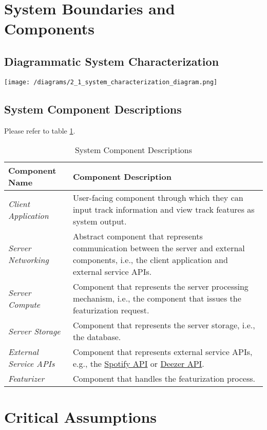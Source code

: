 \documentclass{article}
\begin{document}
\section{System Boundaries and Components}
\subsection{Diagrammatic System Characterization}
\begin{center}
    \texttt{[image: /diagrams/2\_1\_system\_characterization\_diagram.png]}
\end{center}
\subsection{System Component Descriptions}
Please refer to table \ref{tbl:sys-cmpnt-desc}.
\begin{table}[h!]
    \centering
    \begin{tabular}{ p{.25\linewidth} || p{.65\linewidth} }
      \textbf{Component Name} & \textbf{Component Description} \\
      \toprule
      \emph{Client Application} & User-facing component through which they can input track information and view track features as system output. \\
      \midrule
      \emph{Server Networking} & Abstract component that represents communication between the server and external components, i.e., the client application and external service APIs. \\
      \midrule
      \emph{Server Compute} & Component that represents the server processing mechanism, i.e., the component that issues the featurization request. \\
      \midrule
      \emph{Server Storage} & Component that represents the server storage, i.e., the database. \\
      \midrule
      \emph{External Service APIs} & Component that represents external service APIs, e.g., the \href{https://developer.spotify.com/}{Spotify API} or \href{https://developers.deezer.com/}{Deezer API}. \\
      \midrule
      \emph{Featurizer} & Component that handles the featurization process.
    \end{tabular}
    \label{tbl:sys-cmpnt-desc}
    \caption{System Component Descriptions}
  \end{table}

\newpage
\section{Critical Assumptions}
\end{document}
